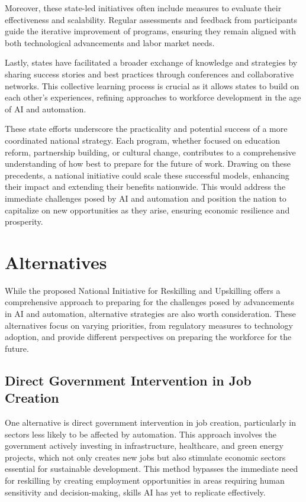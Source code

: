 \documentclass[11pt]{article}
\begin{document}
Moreover, these state-led initiatives often include measures to evaluate their effectiveness and scalability. Regular assessments and feedback from participants guide the iterative improvement of programs, ensuring they remain aligned with both technological advancements and labor market needs.

Lastly, states have facilitated a broader exchange of knowledge and strategies by sharing success stories and best practices through conferences and collaborative networks. This collective learning process is crucial as it allows states to build on each other's experiences, refining approaches to workforce development in the age of AI and automation.

These state efforts underscore the practicality and potential success of a more coordinated national strategy. Each program, whether focused on education reform, partnership building, or cultural change, contributes to a comprehensive understanding of how best to prepare for the future of work. Drawing on these precedents, a national initiative could scale these successful models, enhancing their impact and extending their benefits nationwide. This would address the immediate challenges posed by AI and automation and position the nation to capitalize on new opportunities as they arise, ensuring economic resilience and prosperity.

\section{Alternatives}

While the proposed National Initiative for Reskilling and Upskilling offers a comprehensive approach to preparing for the challenges posed by advancements in AI and automation, alternative strategies are also worth consideration. These alternatives focus on varying priorities, from regulatory measures to technology adoption, and provide different perspectives on preparing the workforce for the future.

\subsection{Direct Government Intervention in Job Creation}

One alternative is direct government intervention in job creation, particularly in sectors less likely to be affected by automation. This approach involves the government actively investing in infrastructure, healthcare, and green energy projects, which not only creates new jobs but also stimulate economic sectors essential for sustainable development. This method bypasses the immediate need for reskilling by creating employment opportunities in areas requiring human sensitivity and decision-making, skills AI has yet to replicate effectively.
\end{document}
